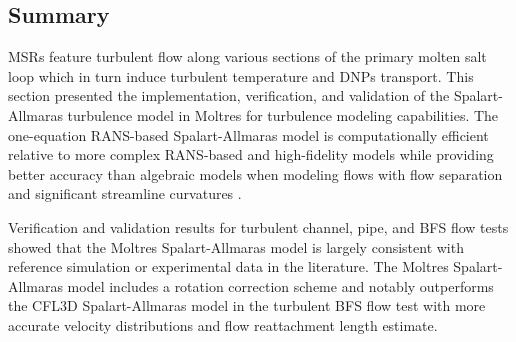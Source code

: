 \FloatBarrier

\subsection{Summary}

\glspl{MSR} feature turbulent flow along various sections of the primary molten salt loop which in
turn induce turbulent temperature and \glspl{DNP} transport. This section presented the
implementation, verification, and validation of the Spalart-Allmaras turbulence model
\cite{spalart_one-equation_1994} in Moltres for turbulence
modeling capabilities. The one-equation \gls{RANS}-based Spalart-Allmaras model is computationally
efficient relative to more complex \gls{RANS}-based and high-fidelity models while providing better
accuracy than algebraic models when modeling flows with flow separation and significant streamline
curvatures \cite{wilcox_turbulence_2006}.

Verification and validation results for turbulent channel, pipe, and \gls{BFS} flow tests showed
that the Moltres Spalart-Allmaras model is largely consistent with reference simulation or experimental
data in the literature. The Moltres Spalart-Allmaras model includes a rotation correction scheme
\cite{aupoix_extensions_2003, dacles-mariani_numericalexperimental_1995} and notably outperforms
the CFL3D Spalart-Allmaras model in the turbulent \gls{BFS} flow test with more accurate velocity
distributions and flow reattachment length estimate.
